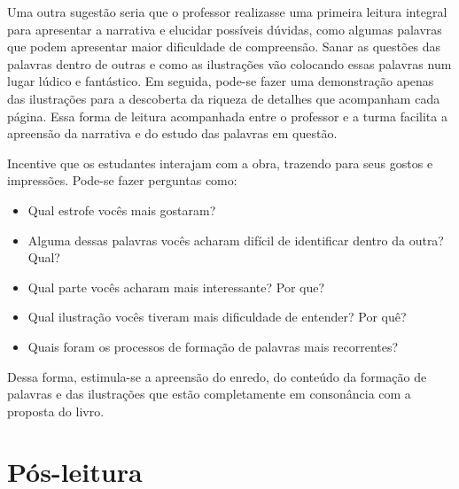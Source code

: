 \documentclass[11pt]{extarticle}
\begin{document}
Uma outra sugestão seria que o professor realizasse uma primeira leitura integral para apresentar a narrativa e elucidar possíveis dúvidas, como algumas palavras que podem apresentar maior dificuldade de compreensão. Sanar as questões das palavras dentro de outras e como as ilustrações vão colocando essas palavras num lugar lúdico e fantástico. Em seguida, pode-se fazer uma demonstração apenas das ilustrações para a descoberta da riqueza de detalhes que acompanham cada página. Essa forma de leitura acompanhada entre o professor e a turma facilita a apreensão da narrativa e do estudo das palavras em questão.


Incentive que os estudantes interajam com a obra, trazendo para seus gostos e impressões. Pode-se fazer perguntas como:

\begin{itemize}
\item Qual estrofe vocês mais gostaram?
\item Alguma dessas palavras vocês acharam difícil de identificar dentro da outra? Qual?
\item Qual parte vocês acharam mais interessante? Por que?
\item Qual ilustração vocês tiveram mais dificuldade de entender? Por quê?
\item Quais foram os processos de formação de palavras mais recorrentes?
\end{itemize}

Dessa forma, estimula-se a apreensão do enredo, do conteúdo da formação de palavras e das ilustrações que estão completamente em consonância com a proposta do livro.

\section{Pós-leitura}

\end{document}
